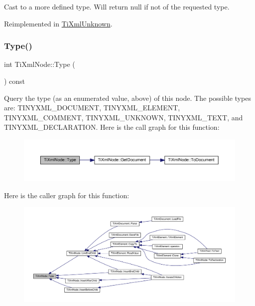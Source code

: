 Cast to a more defined type. Will return null if not of the requested type. 



Reimplemented in \hyperlink{class_ti_xml_unknown_a67c9fd22940e8c47f706a72cdd2e332c}{Ti\+Xml\+Unknown}.

\mbox{\label{class_ti_xml_node_a0f4dd916b2afc2ab2f1a84f3e2b8fd5d}} 
\subsubsection{\texorpdfstring{Type()}{Type()}}
{\footnotesize\ttfamily int Ti\+Xml\+Node\+::\+Type (\begin{DoxyParamCaption}{ }\end{DoxyParamCaption}) const\hspace{0.3cm}{\ttfamily [inline]}}

Query the type (as an enumerated value, above) of this node. The possible types are\+: T\+I\+N\+Y\+X\+M\+L\+\_\+\+D\+O\+C\+U\+M\+E\+NT, T\+I\+N\+Y\+X\+M\+L\+\_\+\+E\+L\+E\+M\+E\+NT, T\+I\+N\+Y\+X\+M\+L\+\_\+\+C\+O\+M\+M\+E\+NT, T\+I\+N\+Y\+X\+M\+L\+\_\+\+U\+N\+K\+N\+O\+WN, T\+I\+N\+Y\+X\+M\+L\+\_\+\+T\+E\+XT, and T\+I\+N\+Y\+X\+M\+L\+\_\+\+D\+E\+C\+L\+A\+R\+A\+T\+I\+ON. Here is the call graph for this function\+:\nopagebreak
\begin{figure}[H]
\begin{center}
\leavevmode
\includegraphics[width=350pt]{class_ti_xml_node_a0f4dd916b2afc2ab2f1a84f3e2b8fd5d_cgraph}
\end{center}
\end{figure}
Here is the caller graph for this function\+:\nopagebreak
\begin{figure}[H]
\begin{center}
\leavevmode
\includegraphics[width=350pt]{class_ti_xml_node_a0f4dd916b2afc2ab2f1a84f3e2b8fd5d_icgraph}
\end{center}
\end{figure}
\mbox{\label{class_ti_xml_node_ad44dfe927d49a74dd78b72b7514417ad}} 
